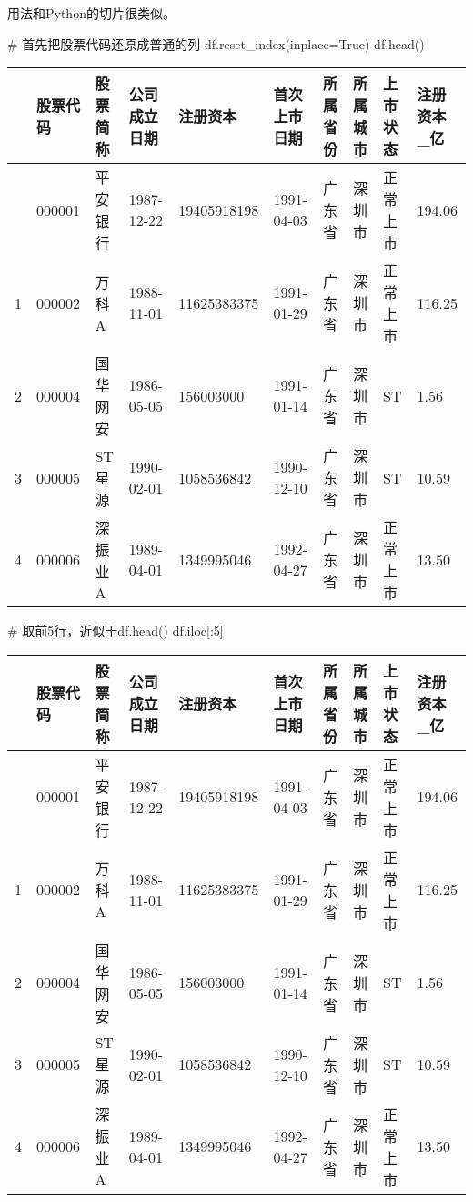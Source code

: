 \documentclass[
  letterpaper,
  DIV=11,
  numbers=noendperiod]{scrreprt}
\newenvironment{Shaded}{\begin{snugshade}}{\end{snugshade}}
\newcommand{\CommentTok}[1]{\textcolor[rgb]{0.37,0.37,0.37}{#1}}
\newcommand{\DecValTok}[1]{\textcolor[rgb]{0.68,0.00,0.00}{#1}}
\newcommand{\NormalTok}[1]{\textcolor[rgb]{0.00,0.23,0.31}{#1}}
\newcommand{\OperatorTok}[1]{\textcolor[rgb]{0.37,0.37,0.37}{#1}}
\newcommand{\VariableTok}[1]{\textcolor[rgb]{0.07,0.07,0.07}{#1}}
\begin{document}
用法和Python的切片很类似。

\begin{Shaded}
\begin{Highlighting}[]
\CommentTok{\# 首先把股票代码还原成普通的列}
\NormalTok{df.reset\_index(inplace}\OperatorTok{=}\VariableTok{True}\NormalTok{)}
\NormalTok{df.head()}
\end{Highlighting}
\end{Shaded}

\begin{longtable}[]{@{}llllllllll@{}}
\toprule\noalign{}
& 股票代码 & 股票简称 & 公司成立日期 & 注册资本 & 首次上市日期 &
所属省份 & 所属城市 & 上市状态 & 注册资本\_亿 \\
\midrule\noalign{}
\endhead
\bottomrule\noalign{}
\endlastfoot
0 & 000001 & 平安银行 & 1987-12-22 & 19405918198 & 1991-04-03 & 广东省 &
深圳市 & 正常上市 & 194.06 \\
1 & 000002 & 万科A & 1988-11-01 & 11625383375 & 1991-01-29 & 广东省 &
深圳市 & 正常上市 & 116.25 \\
2 & 000004 & 国华网安 & 1986-05-05 & 156003000 & 1991-01-14 & 广东省 &
深圳市 & ST & 1.56 \\
3 & 000005 & ST 星源 & 1990-02-01 & 1058536842 & 1990-12-10 & 广东省 &
深圳市 & ST & 10.59 \\
4 & 000006 & 深振业A & 1989-04-01 & 1349995046 & 1992-04-27 & 广东省 &
深圳市 & 正常上市 & 13.50 \\
\end{longtable}

\begin{Shaded}
\begin{Highlighting}[]
\CommentTok{\# 取前5行，近似于df.head()}
\NormalTok{df.iloc[:}\DecValTok{5}\NormalTok{]}
\end{Highlighting}
\end{Shaded}

\begin{longtable}[]{@{}llllllllll@{}}
\toprule\noalign{}
& 股票代码 & 股票简称 & 公司成立日期 & 注册资本 & 首次上市日期 &
所属省份 & 所属城市 & 上市状态 & 注册资本\_亿 \\
\midrule\noalign{}
\endhead
\bottomrule\noalign{}
\endlastfoot
0 & 000001 & 平安银行 & 1987-12-22 & 19405918198 & 1991-04-03 & 广东省 &
深圳市 & 正常上市 & 194.06 \\
1 & 000002 & 万科A & 1988-11-01 & 11625383375 & 1991-01-29 & 广东省 &
深圳市 & 正常上市 & 116.25 \\
2 & 000004 & 国华网安 & 1986-05-05 & 156003000 & 1991-01-14 & 广东省 &
深圳市 & ST & 1.56 \\
3 & 000005 & ST 星源 & 1990-02-01 & 1058536842 & 1990-12-10 & 广东省 &
深圳市 & ST & 10.59 \\
4 & 000006 & 深振业A & 1989-04-01 & 1349995046 & 1992-04-27 & 广东省 &
深圳市 & 正常上市 & 13.50 \\
\end{longtable}
\end{document}
